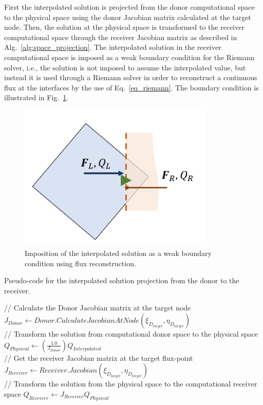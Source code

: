 First the interpolated solution is projected from the donor computational space to the physical space using the donor Jacobian matrix calculated at the target node. Then, the solution at the physical space is transformed to the receiver computational space through the receiver Jacobian matrix as described in Alg.\ \ref{alg:space_projection}. The interpolated solution in the receiver computational space is imposed as a weak boundary condition for the Riemann solver, i.e., the solution is not imposed to assume the interpolated value, but instead it is used through a Riemann solver in order to reconstruct a continuous flux at the interfaces by the use of Eq.\ \ref{eq_riemann}. The boundary condition is illustrated in Fig.\ \ref{fig:space_transform_p4}.
%
\begin{figure}[H]
	\centering
	\includegraphics[height=7.0cm]{figs/overset/interpolation.png}
    \caption{Imposition of the interpolated solution as a weak boundary condition using flux reconstruction.}
    \label{fig:space_transform_p4}
\end{figure}
%

\begin{algorithm}
\caption{Pseudo-code for the interpolated solution projection from the donor to the receiver.}
\label{alg:space_projection}
\begin{algorithmic} [1]
\State // Calculate the Donor Jacobian matrix at the target node 
\State $J_{Donor} \gets Donor.CalculateJacobianAtNode(\xi_{D_{target}}, \eta_{D_{target}})$ \\
\State // Transform the solution from computational donor space to the physical space 
\State $Q_{Physical} \gets (\frac{1.0}{J_{Donor}}) Q_{Interpolated}$ \\
\State // Get the receiver Jacobian matrix at the target flux-point 
\State  $J_{Receiver} \gets Receiver.Jacobian(\xi_{D_{target}}, \eta_{D_{target}})$ \\
\State // Transform the solution from the physical space to the computational receiver space 
\State $Q_{Receiver} \gets J_{Receiver} Q_{Physical}$ 
\end{algorithmic}
\end{algorithm}

